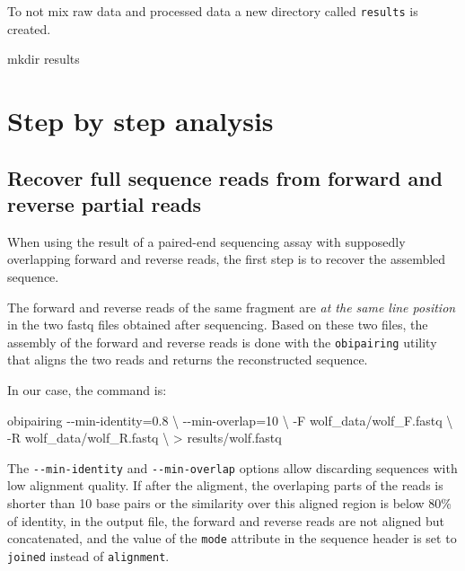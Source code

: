 \documentclass[
  letterpaper,
  DIV=11,
  numbers=noendperiod]{scrreprt}
\newenvironment{Shaded}{\begin{snugshade}}{\end{snugshade}}
\newcommand{\AttributeTok}[1]{\textcolor[rgb]{0.40,0.45,0.13}{#1}}
\newcommand{\DataTypeTok}[1]{\textcolor[rgb]{0.68,0.00,0.00}{#1}}
\newcommand{\ExtensionTok}[1]{\textcolor[rgb]{0.00,0.23,0.31}{#1}}
\newcommand{\FunctionTok}[1]{\textcolor[rgb]{0.28,0.35,0.67}{#1}}
\newcommand{\NormalTok}[1]{\textcolor[rgb]{0.00,0.23,0.31}{#1}}
\newcommand{\OperatorTok}[1]{\textcolor[rgb]{0.37,0.37,0.37}{#1}}
\begin{document}
To not mix raw data and processed data a new directory called
\texttt{results} is created.

\begin{Shaded}
\begin{Highlighting}[]
\FunctionTok{mkdir}\NormalTok{ results}
\end{Highlighting}
\end{Shaded}

\hypertarget{step-by-step-analysis}{%
\section{Step by step analysis}\label{step-by-step-analysis}}

\hypertarget{recover-full-sequence-reads-from-forward-and-reverse-partial-reads}{%
\subsection{Recover full sequence reads from forward and reverse partial
reads}\label{recover-full-sequence-reads-from-forward-and-reverse-partial-reads}}

When using the result of a paired-end sequencing assay with supposedly
overlapping forward and reverse reads, the first step is to recover the
assembled sequence.

The forward and reverse reads of the same fragment are \emph{at the same
line position} in the two fastq files obtained after sequencing. Based
on these two files, the assembly of the forward and reverse reads is
done with the \texttt{obipairing} utility that aligns the two reads and
returns the reconstructed sequence.

In our case, the command is:

\begin{Shaded}
\begin{Highlighting}[]
\ExtensionTok{obipairing} \AttributeTok{{-}{-}min{-}identity}\OperatorTok{=}\NormalTok{0.8 }\DataTypeTok{\textbackslash{}}
           \AttributeTok{{-}{-}min{-}overlap}\OperatorTok{=}\NormalTok{10 }\DataTypeTok{\textbackslash{}}
           \AttributeTok{{-}F}\NormalTok{ wolf\_data/wolf\_F.fastq }\DataTypeTok{\textbackslash{}}
           \AttributeTok{{-}R}\NormalTok{ wolf\_data/wolf\_R.fastq }\DataTypeTok{\textbackslash{}}
           \OperatorTok{\textgreater{}}\NormalTok{ results/wolf.fastq }
\end{Highlighting}
\end{Shaded}

The \texttt{-\/-min-identity} and \texttt{-\/-min-overlap} options allow
discarding sequences with low alignment quality. If after the aligment,
the overlaping parts of the reads is shorter than 10 base pairs or the
similarity over this aligned region is below 80\% of identity, in the
output file, the forward and reverse reads are not aligned but
concatenated, and the value of the \texttt{mode} attribute in the
sequence header is set to \texttt{joined} instead of \texttt{alignment}.
\end{document}
